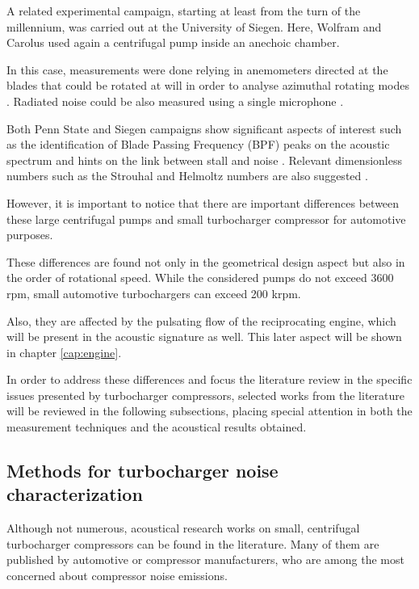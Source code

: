 A related experimental campaign, starting at least from the turn of the millennium, was carried out at the University of Siegen. Here, Wolfram and Carolus \cite{wolfram2010experimental} used again a centrifugal pump inside an anechoic chamber. 

In this case, measurements were done relying in anemometers directed at the blades that could be rotated at will in order to analyse azimuthal rotating modes \cite{wolfram2009detection}. Radiated noise could be also measured using a single microphone \cite{carolus2000experimental}.

Both Penn State and Siegen campaigns show significant aspects of interest such as the identification of Blade Passing Frequency (BPF) peaks on the acoustic spectrum and hints on the link between stall and noise \cite{mongeau1993sound}. Relevant dimensionless numbers such as the Strouhal and Helmoltz numbers are also suggested \cite{mongeau1995method}. 

However, it is important to notice that there are important differences between these large centrifugal pumps and small turbocharger compressor for automotive purposes.

These differences are found not only in the geometrical design aspect but also in the order of rotational speed. While the considered pumps do not exceed 3600 rpm, small automotive turbochargers can exceed 200 krpm. 

Also, they are affected by the pulsating flow of the reciprocating engine, which will be present in the acoustic signature as well. This later aspect will be shown in chapter \ref{cap:engine}.

In order to address these differences and focus the literature review in the specific issues presented by turbocharger compressors, selected works from the literature will be reviewed in the following subsections, placing special attention in both the measurement techniques and the acoustical results obtained.

\subsection{Methods for turbocharger noise characterization}

Although not numerous, acoustical research works on small, centrifugal turbocharger compressors can be found in the literature. Many of them are published by automotive or compressor manufacturers, who are among the most concerned about compressor noise emissions.


